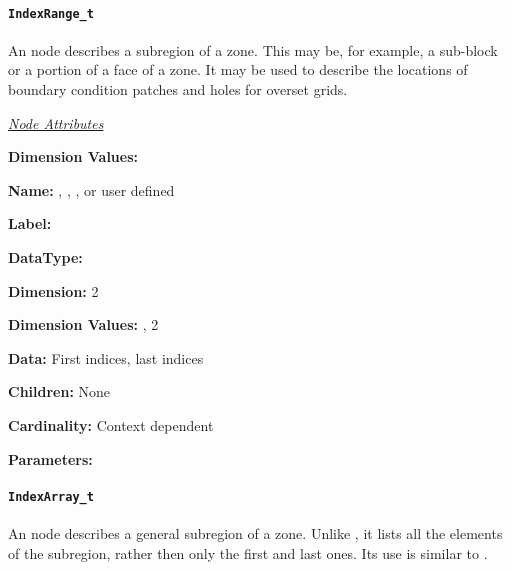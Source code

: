\paragraph{\texttt{IndexRange\_t}}

An  node describes a subregion of a zone. This may
be, for example, a sub-block or a portion of a face of a zone. It may be
used to describe the locations of boundary condition patches and holes
for overset grids.

\textit{\uline{Node Attributes}}
\begin{Ventryic}{\textbf{Dimension Values:}}
\item [\textbf{Name:}]
      , , ,
      or user defined
\item [\textbf{Label:}]
\item [\textbf{DataType:}]
\item [\textbf{Dimension:}]
      2
\item [\textbf{Dimension Values:}]
      , 2
\item [\textbf{Data:}]
      First indices, last indices
\item [\textbf{Children:}]
      None
\item [\textbf{Cardinality:}]
      Context dependent
\item [\textbf{Parameters:}]
\end{Ventryic}

\paragraph{\texttt{IndexArray\_t}}

An  node describes a general subregion of a
zone. Unlike , it lists all the elements of the
subregion, rather then only the first and last ones. Its use is similar
to .

